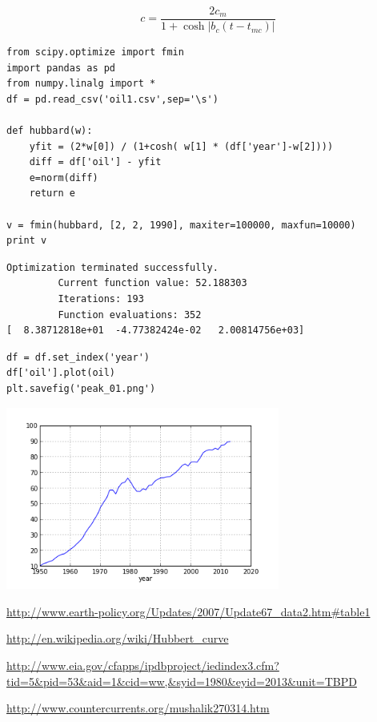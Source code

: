 \documentclass[12pt,fleqn]{article}\usepackage{../common}
\begin{document}
$$ 
c = \frac{ 2c_m}{1 + \cosh |b_c(t-t_{mc})|   }
$$


\begin{verbatim}
from scipy.optimize import fmin
import pandas as pd
from numpy.linalg import *
df = pd.read_csv('oil1.csv',sep='\s')

def hubbard(w):
    yfit = (2*w[0]) / (1+cosh( w[1] * (df['year']-w[2])))
    diff = df['oil'] - yfit
    e=norm(diff)
    return e

v = fmin(hubbard, [2, 2, 1990], maxiter=100000, maxfun=10000)
print v
\end{verbatim}

\begin{verbatim}
Optimization terminated successfully.
         Current function value: 52.188303
         Iterations: 193
         Function evaluations: 352
[  8.38712818e+01  -4.77382424e-02   2.00814756e+03]
\end{verbatim}

\begin{verbatim}
df = df.set_index('year')
df['oil'].plot(oil)
plt.savefig('peak_01.png')
\end{verbatim}

\includegraphics[height=6cm]{peak_01.png}

\url{http://www.earth-policy.org/Updates/2007/Update67_data2.htm#table1}

\url{http://en.wikipedia.org/wiki/Hubbert_curve}

\url{http://www.eia.gov/cfapps/ipdbproject/iedindex3.cfm?tid=5&pid=53&aid=1&cid=ww,&syid=1980&eyid=2013&unit=TBPD}

\url{http://www.countercurrents.org/mushalik270314.htm}
\end{document}
